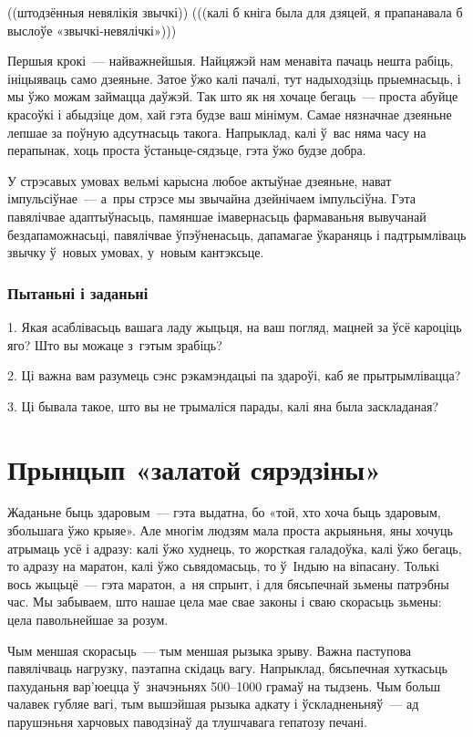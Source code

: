 ((штодзённыя невялікія звычкі)) (((калі б кніга была для дзяцей, я прапанавала б выслоўе «звычкі-невялічкі»)))

Першыя крокі~--- найважнейшыя. Найцяжэй нам менавіта пачаць нешта рабіць, ініцыяваць само дзеяньне. Затое ўжо калі пачалі, тут надыходзіць прыемнасьць, і мы ўжо можам займацца даўжэй. Так што як ня хочаце бегаць~--- проста абуйце красоўкі і абыдзіце дом, хай гэта будзе ваш мінімум. Самае нязначнае дзеяньне лепшае за поўную адсутнасьць такога. Напрыклад, калі ў~вас няма часу на перапынак, хоць проста ўстаньце-сядзьце, гэта ўжо будзе добра.

У стрэсавых умовах вельмі карысна любое актыўнае дзеяньне, нават імпульсіўнае~--- а~пры стрэсе мы звычайна дзейнічаем імпульсіўна. Гэта павялічвае адаптыўнасьць, памяншае імавернасьць фармаваньня вывучанай бездапаможнасьці, павялічвае ўпэўненасьць, дапамагае ўкараняць і падтрымліваць звычку ў~новых умовах, у~новым кантэксьце.

\subsubsection{Пытаньні і заданьні}

1. Якая асаблівасьць вашага ладу жыцьця, на ваш погляд, мацней за ўсё кароціць яго? Што вы можаце з~гэтым зрабіць?

2. Ці важна вам разумець сэнс рэкамэндацыі па здароўі, каб яе прытрымлівацца?

3. Ці бывала такое, што вы не трымаліся парады, калі яна была заскладаная?


\section{Прынцып «залатой сярэдзіны»}

Жаданьне быць здаровым~--- гэта выдатна, бо «той, хто хоча быць здаровым, збольшага ўжо крыяе». Але многім людзям мала проста акрыяньня, яны хочуць атрымаць усё і адразу: калі ўжо худнець, то жорсткая галадоўка, калі ўжо бегаць, то адразу на маратон, калі ўжо сьвядомасьць, то ў~Індыю на віпасану. Толькі вось жыцьцё~--- гэта маратон, а~ня спрынт, і для бясьпечнай зьмены патрэбны час. Мы забываем, што нашае цела мае свае законы і сваю скорасьць зьмены: цела павольнейшае за розум.

Чым меншая скорасьць~--- тым меншая рызыка зрыву. Важна паступова павялічваць нагрузку, паэтапна скідаць вагу. Напрыклад, бясьпечная хуткасьць пахуданьня вар'юецца ў~значэньнях 500--1000 грамаў на тыдзень. Чым больш чалавек губляе вагі, тым вышэйшая рызыка адкату і ўскладненьняў~--- ад парушэньня харчовых паводзінаў да тлушчавага гепатозу печані.

